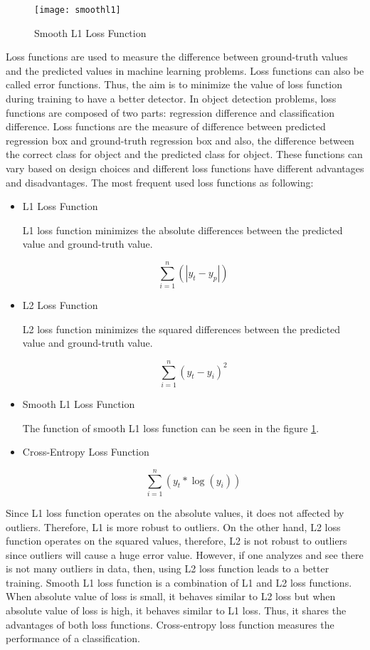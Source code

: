 \documentclass{article}
\begin{document}
\setlength{\parindent}{6ex}

\begin{figure}
    \centering
    \texttt{[image: smoothl1]}
    \caption{Smooth L1 Loss Function}
    \label{fig:smoothl11}
\end{figure}
\indent

Loss functions are used to measure the difference between ground-truth 
values and the predicted values in machine learning problems. Loss 
functions can also be called error functions. Thus, the aim is to minimize 
the value of loss function during training to have a better detector. 
In object detection problems, loss functions are composed of two parts: 
regression difference and classification difference. Loss functions are 
the measure of difference between predicted regression box and 
ground-truth regression box and also, the difference between the correct 
class for object and the predicted class for object. These functions can 
vary based on design choices and different loss functions have different 
advantages and disadvantages. The most frequent used loss functions as 
following:
\begin{itemize}
    \item L1 Loss Function
    
    L1 loss function minimizes the absolute differences between the
    predicted value and ground-truth value.

    $$\sum_{i=1}^{n} (|y_t - y_p|)$$

    \item L2 Loss Function
    
    L2 loss function minimizes the squared differences between the 
    predicted value and ground-truth value.

    $$\sum_{i=1}^{n} (y_t - y_i)^{2}$$

    \item Smooth L1 Loss Function
    
    The function of smooth L1 loss function can be seen in the figure \ref{fig:smoothl11}.

    \item Cross-Entropy Loss Function

    $$\sum_{i=1}^{n} (y_t * \log (y_i))$$

\end{itemize}    
\indent

Since L1 loss function operates on the absolute values, it does not 
affected by outliers. Therefore, L1 is more robust to outliers. On the
other hand, L2 loss function operates on the squared values, therefore, 
L2 is not robust to outliers since outliers will cause a huge error value. 
However, if one analyzes and see there is not many outliers in data, then, 
using L2 loss function leads to a better training. Smooth L1 loss function is a 
combination of L1 and L2 loss functions. When absolute value of loss is small, it 
behaves similar to L2 loss but when absolute value of loss is high, it behaves 
similar to L1 loss. Thus, it shares the advantages of both loss functions. Cross-entropy 
loss function measures the performance of a classification. 
\end{document}

